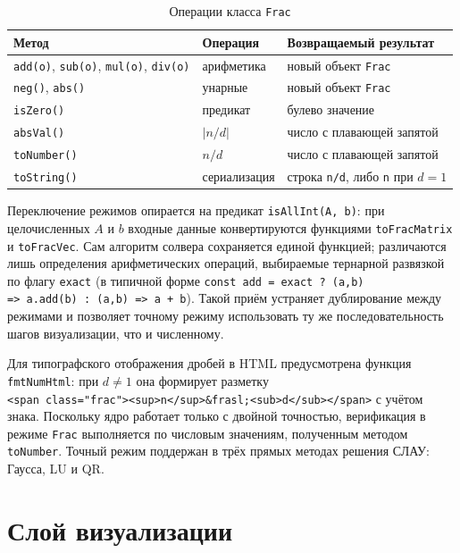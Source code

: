 \documentclass[12pt, oneside]{book}
\begin{document}
\begin{table}[!htbp]
\centering
\scriptsize
\renewcommand{\arraystretch}{1.15}
\begin{tabular}{|p{4.2cm}|p{3.5cm}|p{5.0cm}|}
\hline
\rowcolor{thbg} \textbf{Метод} & \textbf{Операция} & \textbf{Возвращаемый результат} \\
\hline
\texttt{add(o)}, \texttt{sub(o)}, \texttt{mul(o)}, \texttt{div(o)} & арифметика & новый объект \texttt{Frac} \\ \hline
\texttt{neg()}, \texttt{abs()} & унарные & новый объект \texttt{Frac} \\ \hline
\texttt{isZero()} & предикат & булево значение \\ \hline
\texttt{absVal()} & $|n/d|$ & число с плавающей запятой \\ \hline
\texttt{toNumber()} & $n/d$ & число с плавающей запятой \\ \hline
\texttt{toString()} & сериализация & строка \texttt{n/d}, либо \texttt{n} при $d=1$ \\ \hline
\end{tabular}
\caption{Операции класса \texttt{Frac}}
\label{tab:frac_ops}
\end{table}

    \quad Переключение режимов опирается на предикат \texttt{isAllInt(A, b)}: при целочисленных $A$ и $b$ входные данные конвертируются функциями \texttt{toFracMatrix} и \texttt{toFracVec}. Сам алгоритм солвера сохраняется единой функцией; различаются лишь определения арифметических операций, выбираемые тернарной развязкой по флагу \texttt{exact} (в типичной форме \texttt{const add = exact ? (a,b)\\ => a.add(b) : (a,b) => a + b}). Такой приём устраняет дублирование между режимами и позволяет точному режиму использовать ту же последовательность шагов визуализации, что и численному.

    \quad Для типографского отображения дробей в HTML предусмотрена функция \texttt{fmtNumHtml}: при $d \ne 1$ она формирует разметку\\ \texttt{<span class="frac"><sup>n</sup>\&frasl;<sub>d</sub></span>} с учётом знака. Поскольку ядро работает только с двойной точностью, верификация в режиме \texttt{Frac} выполняется по числовым значениям, полученным методом \texttt{toNumber}. Точный режим поддержан в трёх прямых методах решения СЛАУ: Гаусса, LU и QR.

\section{Слой визуализации}
\end{document}
